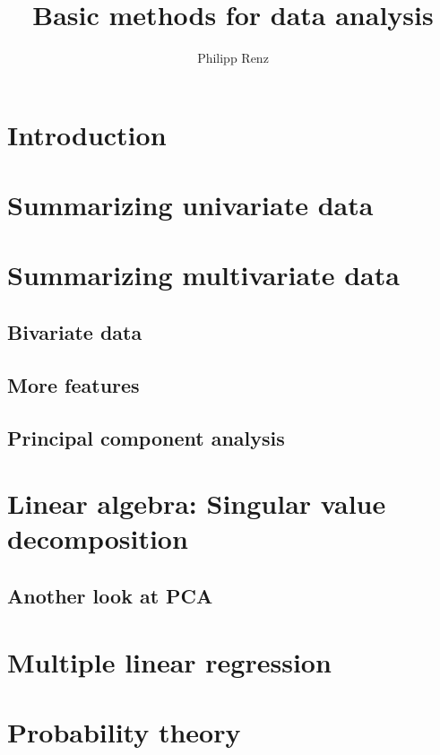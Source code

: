 \documentclass{article}
\title{Basic methods for data analysis}
\author{Philipp Renz}
\begin{document}
\maketitle
\tableofcontents
\section{Introduction}
\section{Summarizing univariate data}


\section{Summarizing multivariate data}
\subsection{Bivariate data}
\subsection{More features}
\subsection{Principal component analysis}
\section{Linear algebra: Singular value decomposition}
\subsection{Another look at PCA}
\section{Multiple linear regression}
\section{Probability theory}
\section{}
\end{document}
